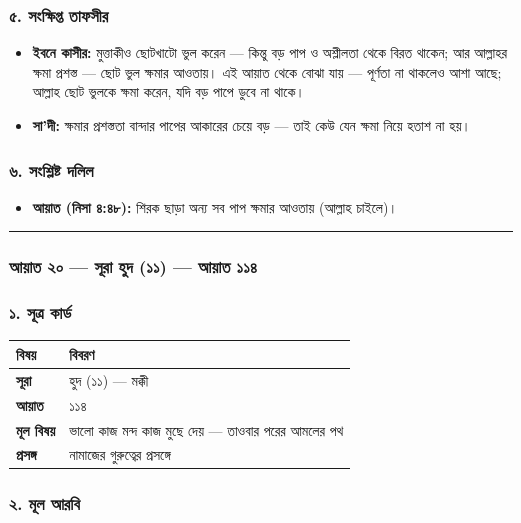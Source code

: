 \subsubsection*{৫. সংক্ষিপ্ত তাফসীর}

\begin{itemize}
\item \textbf{ইবনে কাসীর:} মুত্তাকীও ছোটখাটো ভুল করেন — কিন্তু বড় পাপ ও অশ্লীলতা থেকে বিরত থাকেন; আর আল্লাহর ক্ষমা প্রশস্ত — ছোট ভুল ক্ষমার আওতায়। এই আয়াত থেকে বোঝা যায় — পূর্ণতা না থাকলেও আশা আছে; আল্লাহ ছোট ভুলকে ক্ষমা করেন, যদি বড় পাপে ডুবে না থাকে।
\item \textbf{সা'দী:} ক্ষমার প্রশস্ততা বান্দার পাপের আকারের চেয়ে বড় — তাই কেউ যেন ক্ষমা নিয়ে হতাশ না হয়।
\end{itemize}
\subsubsection*{৬. সংশ্লিষ্ট দলিল}

\begin{itemize}
\item \textbf{আয়াত (নিসা ৪:৪৮):} শিরক ছাড়া অন্য সব পাপ ক্ষমার আওতায় (আল্লাহ চাইলে)।
\end{itemize}
\medskip\hrule\medskip

\subsubsection*{আয়াত ২০ — সূরা হুদ (১১) — আয়াত ১১৪}

\subsubsection*{১. সূত্র কার্ড}

\begin{table}[h]\centering\small
\begin{tabular}{ll}
বিষয় & বিবরণ \\
\hline
\textbf{সূরা} & হুদ (১১) — মক্কী \\
\textbf{আয়াত} & ১১৪ \\
\textbf{মূল বিষয়} & ভালো কাজ মন্দ কাজ মুছে দেয় — তাওবার পরের আমলের পথ \\
\textbf{প্রসঙ্গ} & নামাজের গুরুত্বের প্রসঙ্গে \\
\hline
\end{tabular}
\end{table}

\subsubsection*{২. মূল আরবি}

